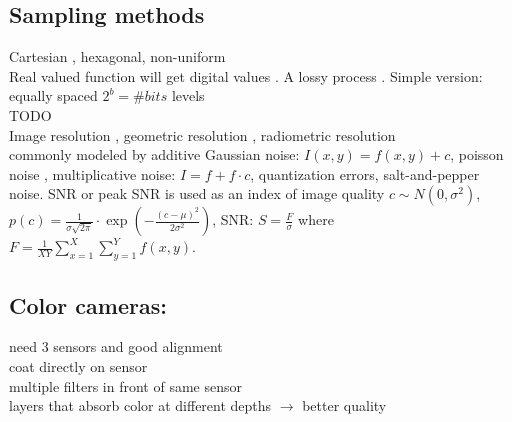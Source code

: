 \subsection*{Sampling methods}
Cartesian , hexagonal, non-uniform\\
 Real valued function will get digital values . A lossy process . Simple version: equally spaced $2^b = \#bits$ levels\\
 TODO\\
 Image resolution , geometric resolution , radiometric resolution \\
 commonly modeled by additive Gaussian noise: $I(x, y) = f(x, y) + c$, poisson noise , multiplicative noise: $I = f + f \cdot c$, quantization errors, salt-and-pepper noise. SNR or peak SNR is used as an index of image quality $c \sim N(0, \sigma^2)$, $p(c) = \frac{1}{\sigma \sqrt{2\pi}} \cdot \exp\left(-\frac{(c - \mu)^2}{2\sigma^2}\right)$, SNR: $S = \frac{F}{\sigma}$ where $F = \frac{1}{XY}\sum_{x = 1}^X \sum_{y = 1}^{Y} f(x, y)$.
\subsection*{Color cameras:}
 need 3 sensors and good alignment\\
 coat directly on sensor \\
 multiple filters in front of same sensor\\
 layers that absorb color at different depths $\rightarrow$ better quality